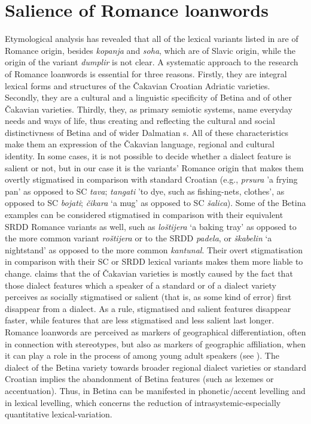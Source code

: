 \documentclass[output=paper]{LSP/langsci}
\begin{document}
\largerpage
\section{Salience of Romance loanwords}
Etymological analysis has revealed that all of the lexical variants listed in  are of Romance origin, besides \textit{kopanja} and \textit{soha}, which are of Slavic origin, while the origin of the variant \textit{dumplir} is not clear. A systematic approach to the research of Romance loanwords is essential for three reasons. Firstly, they are integral lexical forms and structures of the Čakavian Croatian Adriatic varieties. Secondly, they are a cultural and a linguistic specificity of Betina and of other Čakavian varieties. Thirdly, they, as primary semiotic systems, name everyday needs and ways of life, thus creating and reflecting the cultural and social distinctivness of Betina and of wider Dalmatian s. All of these characteristics make them an expression of the Čakavian language, regional and cultural identity. In some cases, it is not possible to decide whether a dialect feature is salient or not, but in our case it is the variants’ Romance origin that makes them overtly stigmatised in comparison with standard Croatian (e.g., \textit{prsura} 'a frying pan' as opposed to SC \textit{tava}; \textit{tangati} 'to dye, such as fishing-nets, clothes’, as opposed to SC \textit{bojati}; \textit{čikara} ‘a mug’ as opposed to SC \textit{šalica}). Some of the Betina examples can be considered stigmatised in comparison with their equivalent SRDD Romance variants as well, such as \textit{loštijera} ‘a baking tray’ as opposed to the more common variant \textit{roštijera} or to the SRDD \textit{padela}, or \textit{škabelin} ‘a nightstand’ as opposed to the more common \textit{kantunal}. Their overt stigmatisation in comparison with their SC or SRDD lexical variants makes them more liable to change. \citet[30--32]{jutronic_spliski_2010} claims that the  of Čakavian varieties is mostly caused by the fact that those dialect features which a speaker of a standard or of a dialect variety perceives as socially stigmatised or salient (that is, as some kind of error) first disappear from a dialect. As a rule, stigmatised and salient features disappear faster, while features that are less stigmatised and less salient last longer. Romance loanwords are perceived as markers of geographical differentiation, often in connection with stereotypes, but also as markers of geographic affiliation, when it can play a role in the process of  among young adult speakers (see \citealt[44--45]{auer_study_2004}). The dialect  of the Betina variety towards broader regional dialect varieties or standard Croatian implies the abandonment of Betina features (such as lexemes or accentuation). Thus,  in Betina can be manifested in phonetic/accent levelling and in lexical levelling, which concerns the reduction of intrasystemic-especially quantitative lexical-variation.
\end{document}
